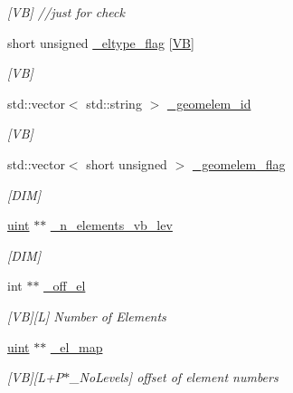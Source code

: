 \begin{DoxyCompactItemize}
\begin{DoxyCompactList}\small\item\em \mbox{[}VB\mbox{]} //just for check \end{DoxyCompactList}\item 
short unsigned \mbox{\hyperlink{classfemus_1_1_multi_level_mesh_two_a8f12d2fca872882da380f30ea69984bb}{\+\_\+eltype\+\_\+flag}} \mbox{[}\mbox{\hyperlink{_v_b_type_enum_8hpp_a02ebcbc55b174d8bb6a65cddbe7f90b6}{VB}}\mbox{]}
\begin{DoxyCompactList}\small\item\em \mbox{[}VB\mbox{]} \end{DoxyCompactList}\item 
std\+::vector$<$ std\+::string $>$ \mbox{\hyperlink{classfemus_1_1_multi_level_mesh_two_afddb1d5ec4c83cb731720e4cc0dd5105}{\+\_\+geomelem\+\_\+id}}
\begin{DoxyCompactList}\small\item\em \mbox{[}VB\mbox{]} \end{DoxyCompactList}\item 
std\+::vector$<$ short unsigned $>$ \mbox{\hyperlink{classfemus_1_1_multi_level_mesh_two_af194897d6292b23e5e37689f95409704}{\+\_\+geomelem\+\_\+flag}}
\begin{DoxyCompactList}\small\item\em \mbox{[}D\+IM\mbox{]} \end{DoxyCompactList}\item 
\mbox{\hyperlink{_typedefs_8hpp_a91ad9478d81a7aaf2593e8d9c3d06a14}{uint}} $\ast$$\ast$ \mbox{\hyperlink{classfemus_1_1_multi_level_mesh_two_a2431608d37cb7fbe406de970b6b71788}{\+\_\+n\+\_\+elements\+\_\+vb\+\_\+lev}}
\begin{DoxyCompactList}\small\item\em \mbox{[}D\+IM\mbox{]} \end{DoxyCompactList}\item 
int $\ast$$\ast$ \mbox{\hyperlink{classfemus_1_1_multi_level_mesh_two_a7508c00c363175fd124c4fec42e0637c}{\+\_\+off\+\_\+el}}
\begin{DoxyCompactList}\small\item\em \mbox{[}VB\mbox{]}\mbox{[}L\mbox{]} Number of Elements \end{DoxyCompactList}\item 
\mbox{\hyperlink{_typedefs_8hpp_a91ad9478d81a7aaf2593e8d9c3d06a14}{uint}} $\ast$$\ast$ \mbox{\hyperlink{classfemus_1_1_multi_level_mesh_two_a2bb789736fb24676c0488d1a5a4c6a17}{\+\_\+el\+\_\+map}}
\begin{DoxyCompactList}\small\item\em \mbox{[}VB\mbox{]}\mbox{[}L+\+P$\ast$\+\_\+\+No\+Levels\mbox{]} offset of element numbers \end{DoxyCompactList}\item 
$$
\end{DoxyCompactItemize}
